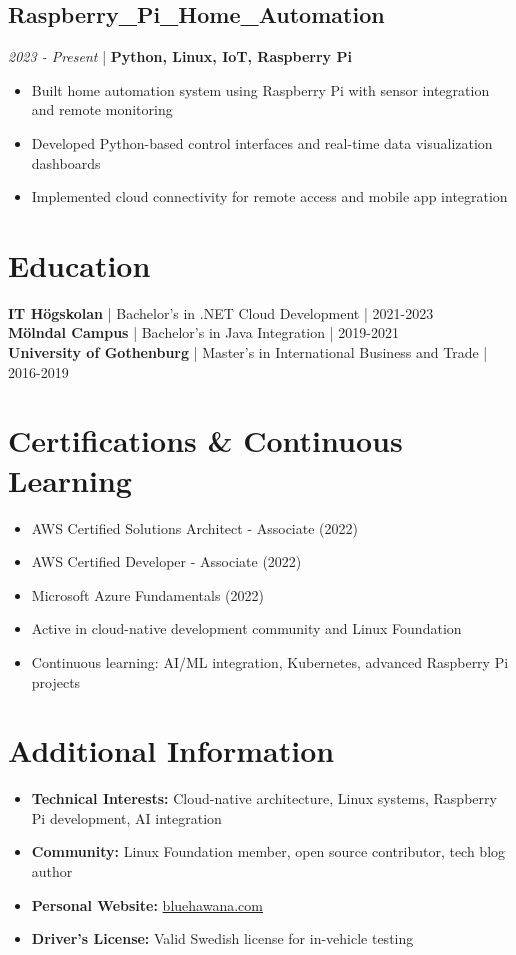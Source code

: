 \documentclass[11pt,a4paper]{article}
\begin{document}
\subsection*{Raspberry\_Pi\_Home\_Automation}
\textit{2023 - Present} | \textbf{Python, Linux, IoT, Raspberry Pi}
\begin{itemize}[noitemsep]
\item Built home automation system using Raspberry Pi with sensor integration and remote monitoring
\item Developed Python-based control interfaces and real-time data visualization dashboards
\item Implemented cloud connectivity for remote access and mobile app integration
\end{itemize}

\section*{Education}
\textbf{IT Högskolan} | Bachelor's in .NET Cloud Development | 2021-2023\\
\textbf{Mölndal Campus} | Bachelor's in Java Integration | 2019-2021\\
\textbf{University of Gothenburg} | Master's in International Business and Trade | 2016-2019

\section*{Certifications \& Continuous Learning}
\begin{itemize}[noitemsep]
\item AWS Certified Solutions Architect - Associate (2022)
\item AWS Certified Developer - Associate (2022)
\item Microsoft Azure Fundamentals (2022)
\item Active in cloud-native development community and Linux Foundation
\item Continuous learning: AI/ML integration, Kubernetes, advanced Raspberry Pi projects
\end{itemize}

\section*{Additional Information}
\begin{itemize}[noitemsep]
\item \textbf{Technical Interests:} Cloud-native architecture, Linux systems, Raspberry Pi development, AI integration
\item \textbf{Community:} Linux Foundation member, open source contributor, tech blog author
\item \textbf{Personal Website:} \href{https://www.bluehawana.com}{bluehawana.com}
\item \textbf{Driver's License:} Valid Swedish license for in-vehicle testing
\end{itemize}
\end{document}
